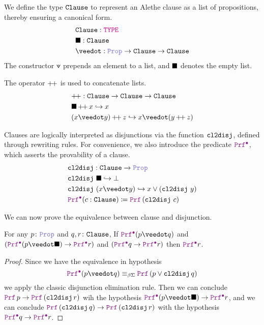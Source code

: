 \begin{definition}\label{def:encoding-clause}
We define the type $\kw{Clause}$ to represent an Alethe clause as a list of propositions, thereby ensuring a canonical form.
\begin{align*}
&\tt{Clause} \index{$\tt{Clause}$}: \type \\
&\nil\index{$\nil$}: \tt{Clause} \\
&\veedot\index{$\veedot$}: \prop \ra \tt{Clause}  \ra \tt{Clause}
\end{align*}
The constructor $\veedot$ prepends an element to a list, and $\nil$ denotes the empty list.
\end{definition}

\begin{definition}
The operator $\pp$ \index{$\pp$} is used to concatenate lists.
\begin{align*}
& \pp: \tt{Clause} \ra \tt{Clause} \ra \tt{Clause} \\
& \nil \mathop{\pp} x \re x \\
& (x \veedot y) \mathop{\pp} z \re x \veedot (y \mathop{\pp} z)
\end{align*}
\end{definition}

\begin{definition}\label{def:cl2disj}
Clauses are logically interpreted as disjunctions via the function $\cltodisj$, defined through rewriting rules. For convenience, we also introduce the predicate $\pid$, which asserts the provability of a clause.
\begin{align*}
& \kw{cl2disj} \index{$\kw{cl2disj}$}: \tt{Clause} \ra \prop \\
& \cltodisj~\nil \re \bot\\
& \cltodisj~(x \veedot y) \re x \lor (\cltodisj~y) \\
& \pid \index{$\pid$} (c : \tt{Clause}) \coloneqq \prf\,(\cltodisj~c)
\end{align*}
\end{definition}

We can now prove the equivalence between clause and disjunction.

\begin{lemma}\label{lemma:clause-elim}
For any $p \colon \prop$ and $q,r \colon \tt{Clause}$, If $\pid (p \veedot q)$ and $(\pid (p \veedot \nil) \ra  \pid r)$ and $(\pid q \ra  \pid r)$ then $\pid r$.
\end{lemma}
\begin{proof}
Since we have the equivalence in hypothesis 
\[
  \pid (p \veedot q) \equivL \prf\,(p \lor \cltodisj\,q)
\]
we apply the classic disjunction elimination rule.
Then we can conclude $\prf\,p \ra \prf\,(\cltodisj\,r)$ wih the hypothesis $\pid (p \veedot \nil) \ra  \pid r$, and we can conclude $\prf\,(\cltodisj\,q) \ra \prf\,(\cltodisj\,r)$
with the hypothesis $\pid q \ra  \pid r$.
\end{proof}


